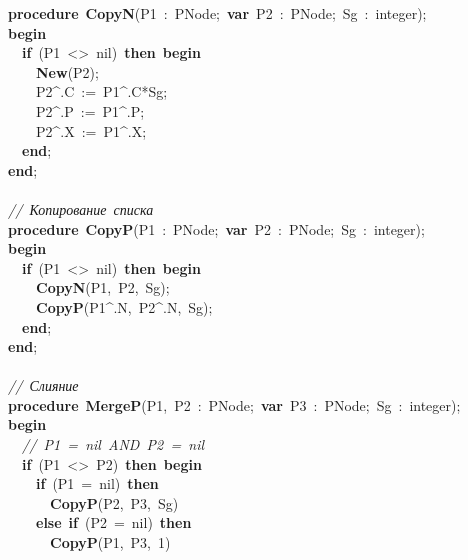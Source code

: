 \mbox{}\textbf{procedure}\ \textbf{CopyN}(P1\ :\ PNode;\ \textbf{var}\ P2\ :\ PNode;\ Sg\ :\ integer); \\
\mbox{}\textbf{begin} \\
\mbox{}\ \ \textbf{if}\ (P1\ \textless{}\textgreater{}\ nil)\ \textbf{then}\ \textbf{begin} \\
\mbox{}\ \ \ \ \textbf{New}(P2); \\
\mbox{}\ \ \ \ P2\textasciicircum{}.C\ :=\ P1\textasciicircum{}.C*Sg; \\
\mbox{}\ \ \ \ P2\textasciicircum{}.P\ :=\ P1\textasciicircum{}.P; \\
\mbox{}\ \ \ \ P2\textasciicircum{}.X\ :=\ P1\textasciicircum{}.X; \\
\mbox{}\ \ \textbf{end}; \\
\mbox{}\textbf{end}; \\
\mbox{} \\
\mbox{}\textit{//\ Копирование\ списка} \\
\mbox{}\textbf{procedure}\ \textbf{CopyP}(P1\ :\ PNode;\ \textbf{var}\ P2\ :\ PNode;\ Sg\ :\ integer); \\
\mbox{}\textbf{begin} \\
\mbox{}\ \ \textbf{if}\ (P1\ \textless{}\textgreater{}\ nil)\ \textbf{then}\ \textbf{begin} \\
\mbox{}\ \ \ \ \textbf{CopyN}(P1,\ P2,\ Sg); \\
\mbox{}\ \ \ \ \textbf{CopyP}(P1\textasciicircum{}.N,\ P2\textasciicircum{}.N,\ Sg); \\
\mbox{}\ \ \textbf{end}; \\
\mbox{}\textbf{end}; \\
\mbox{} \\
\mbox{}\textit{//\ Слияние} \\
\mbox{}\textbf{procedure}\ \textbf{MergeP}(P1,\ P2\ :\ PNode;\ \textbf{var}\ P3\ :\ PNode;\ Sg\ :\ integer); \\
\mbox{}\textbf{begin} \\
\mbox{}\ \ \textit{//\ P1\ =\ nil\ AND\ P2\ =\ nil} \\
\mbox{}\ \ \textbf{if}\ (P1\ \textless{}\textgreater{}\ P2)\ \textbf{then}\ \textbf{begin} \\
\mbox{}\ \ \ \ \textbf{if}\ (P1\ =\ nil)\ \textbf{then} \\
\mbox{}\ \ \ \ \ \ \textbf{CopyP}(P2,\ P3,\ Sg) \\
\mbox{}\ \ \ \ \textbf{else}\ \textbf{if}\ (P2\ =\ nil)\ \textbf{then} \\
\mbox{}\ \ \ \ \ \ \textbf{CopyP}(P1,\ P3,\ 1) \\
